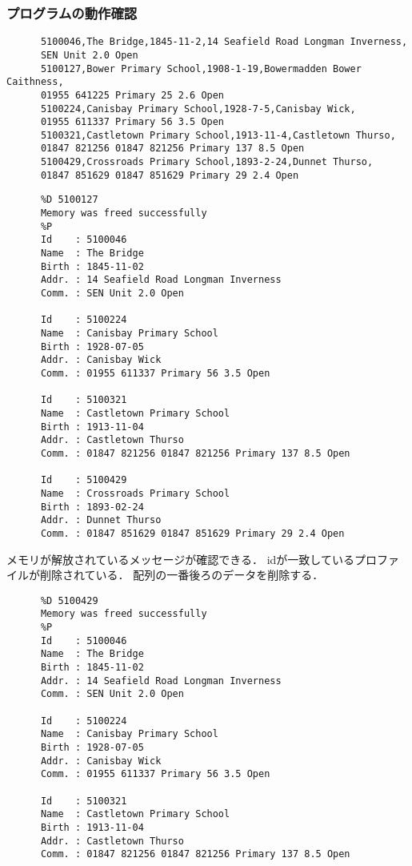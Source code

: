     \subsubsection{プログラムの動作確認}
    
    \begin{verbatim}
      5100046,The Bridge,1845-11-2,14 Seafield Road Longman Inverness,
      SEN Unit 2.0 Open
      5100127,Bower Primary School,1908-1-19,Bowermadden Bower Caithness,
      01955 641225 Primary 25 2.6 Open
      5100224,Canisbay Primary School,1928-7-5,Canisbay Wick,
      01955 611337 Primary 56 3.5 Open
      5100321,Castletown Primary School,1913-11-4,Castletown Thurso,
      01847 821256 01847 821256 Primary 137 8.5 Open
      5100429,Crossroads Primary School,1893-2-24,Dunnet Thurso,
      01847 851629 01847 851629 Primary 29 2.4 Open
    \end{verbatim}
    \begin{verbatim}
      %D 5100127
      Memory was freed successfully
      %P
      Id    : 5100046
      Name  : The Bridge
      Birth : 1845-11-02
      Addr. : 14 Seafield Road Longman Inverness
      Comm. : SEN Unit 2.0 Open

      Id    : 5100224
      Name  : Canisbay Primary School
      Birth : 1928-07-05
      Addr. : Canisbay Wick
      Comm. : 01955 611337 Primary 56 3.5 Open

      Id    : 5100321
      Name  : Castletown Primary School
      Birth : 1913-11-04
      Addr. : Castletown Thurso
      Comm. : 01847 821256 01847 821256 Primary 137 8.5 Open

      Id    : 5100429
      Name  : Crossroads Primary School
      Birth : 1893-02-24
      Addr. : Dunnet Thurso
      Comm. : 01847 851629 01847 851629 Primary 29 2.4 Open

    \end{verbatim}
    メモリが解放されているメッセージが確認できる．
    idが一致しているプロファイルが削除されている．
    配列の一番後ろのデータを削除する．
    \begin{verbatim}
      %D 5100429
      Memory was freed successfully
      %P
      Id    : 5100046
      Name  : The Bridge
      Birth : 1845-11-02
      Addr. : 14 Seafield Road Longman Inverness
      Comm. : SEN Unit 2.0 Open

      Id    : 5100224
      Name  : Canisbay Primary School
      Birth : 1928-07-05
      Addr. : Canisbay Wick
      Comm. : 01955 611337 Primary 56 3.5 Open

      Id    : 5100321
      Name  : Castletown Primary School
      Birth : 1913-11-04
      Addr. : Castletown Thurso
      Comm. : 01847 821256 01847 821256 Primary 137 8.5 Open
    \end{verbatim}
